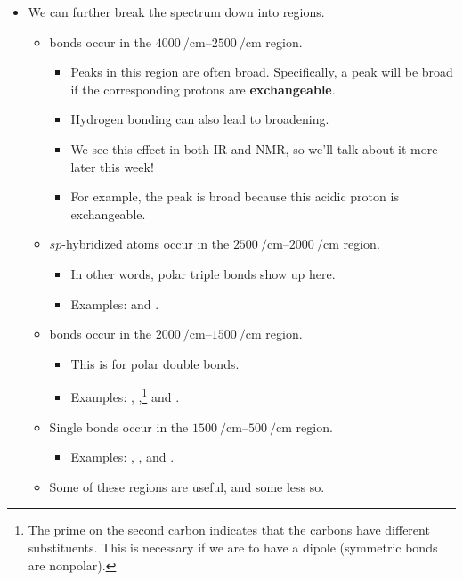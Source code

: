 \documentclass[../notes.tex]{subfiles}
\begin{document}
\begin{itemize}
\begin{itemize}
        \item We can further break the spectrum down into regions.
        \begin{itemize}
            \item {} bonds occur in the $\SIrange{4000}{2500}{\per\centi\meter}$ region.
            \begin{itemize}
                \item Peaks in this region are often broad. Specifically, a peak will be broad if the corresponding protons are \textbf{exchangeable}.
                \item Hydrogen bonding can also lead to broadening.
                \item We see this effect in both IR and NMR, so we'll talk about it more later this week!
                \item For example, the  peak is broad because this acidic proton is exchangeable.
            \end{itemize}
            \item $sp$-hybridized atoms occur in the $\SIrange{2500}{2000}{\per\centi\meter}$ region.
            \begin{itemize}
                \item In other words, polar triple bonds show up here.
                \item Examples:  and .
            \end{itemize}
            \item {} bonds occur in the $\SIrange{2000}{1500}{\per\centi\meter}$ region.
            \begin{itemize}
                \item This is for polar double bonds.
                \item Examples: , ,\footnote{The prime on the second carbon indicates that the carbons have different substituents. This is necessary if we are to have a dipole (symmetric  bonds are nonpolar).} and .
            \end{itemize}
            \item Single bonds occur in the $\SIrange{1500}{500}{\per\centi\meter}$ region.
            \begin{itemize}
                \item Examples: , , and .
            \end{itemize}
            \item Some of these regions are useful, and some less so.

\end{itemize}
\end{itemize}
\end{itemize}
\end{document}
